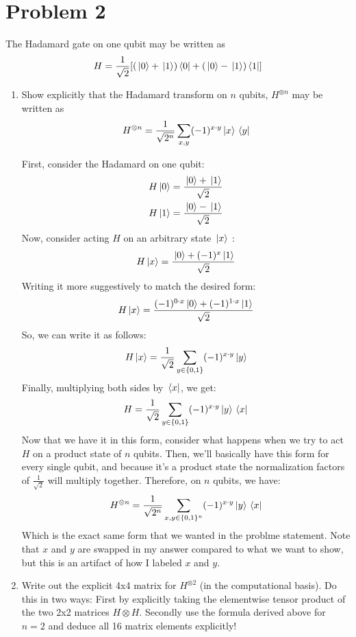 \documentclass[10pt]{article}
\begin{document}
	\section*{Problem 2}
	The Hadamard gate on one qubit may be written as
	\[
		H = \frac{1}{\sqrt{2} }[(\ket*{0} + \ket*{1})\bra*{0} + (\ket*{0} - \ket*{1})\bra*{1}]
	\] 
	\begin{enumerate}[label=\alph*)]
		\item Show explicitly that the Hadamard transform on \( n \) qubits, \( H^{\otimes n} \) may be written 
			as
			\[
				H^{\otimes n} = \frac{1}{\sqrt{2^{n}} }\sum_{x, y} (-1)^{x \cdot y}\ket*{x}\bra*{y}
			\] 

			\begin{solution}
				First, consider the Hadamard on one qubit: 
				\begin{align*}
					H \ket*{0} &= \frac{\ket*{0} + \ket*{1}}{\sqrt{2} }\\
					H \ket*{1} &= \frac{\ket*{0} - \ket*{1}}{\sqrt{2} } 
				\end{align*}
				Now, consider acting \( H \) on an arbitrary state \( \ket*{x} \) :
				\[
				H\ket*{x} = \frac{\ket*{0} + (-1)^{x} \ket*{1}}{\sqrt{2} }
				\]  
				Writing it more suggestively to match the desired form:
				\[
				H \ket*{x} = \frac{(-1)^{0 \cdot x}\ket*{0} + (-1)^{1 \cdot x}\ket*{1}}{\sqrt{2} }
				\] 
				So, we can write it as follows: 
				\[
				H \ket*{x} = \frac{1}{\sqrt{2} }\sum_{y \in \{0, 1\} }(-1)^{x \cdot y} \ket*{y}
				\] 
				Finally, multiplying both sides by \( \bra*{x} \), we get: 
				\[
				H = \frac{1}{\sqrt{2} }\sum_{y \in \{0, 1\} }(-1)^{ x \cdot y}\ket*{y}\bra*{x}
				\] 
				Now that we have it in this form, consider what happens when we try to act \( H\) on a product 
				state of \( n \) qubits. Then, we'll basically have this form for every single qubit, and because it's a
				product state the normalization factors of \( \frac{1}{\sqrt{2} }  \) will multiply 
				together. Therefore, on \( n \) qubits, we have: 
				\[
				H^{\otimes n} = \frac{1}{\sqrt{2^{n}} }\sum_{x, y \in \{0, 1\}^{n}} (-1)^{x \cdot y}\ket*{y} \bra*{x}
				\] 
				Which is the exact same form that we wanted in the problme statement. Note that \( x \) and \( y \) 
				are swapped in my answer compared to what we want to show, but this is an artifact of how I labeled 
				\( x \) and \( y \). 
			\end{solution}
		\item Write out the explicit 4x4 matrix for \( H^{\otimes 2} \) (in the computational basis). Do this in two 
			ways: First by explicitly taking the elementwise tensor product of the two 2x2 matrices 
			\( H \otimes H \). Secondly use the formula derived above for \( n = 2 \) and deduce all 16 matrix elements
			explicitly!


\end{enumerate}
\end{document}
